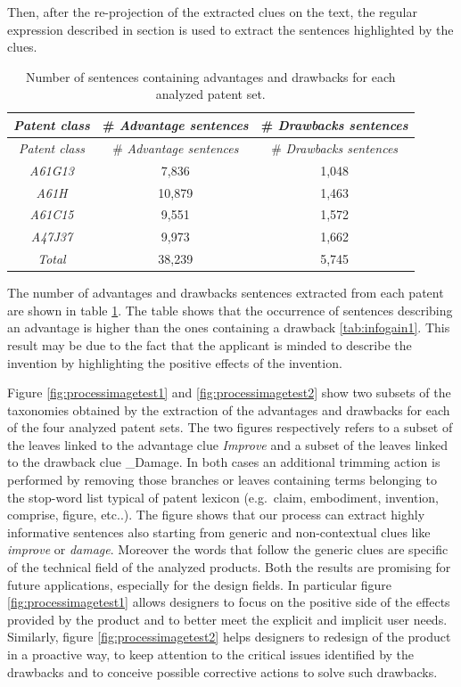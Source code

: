 \documentclass[]{book}
\theoremstyle{definition}
\theoremstyle{definition}
\theoremstyle{definition}
\theoremstyle{remark}
\begin{document}
Then, after the re-projection of the extracted clues on the text, the
regular expression described in section is used to extract the sentences
highlighted by the clues.

\begin{longtable}[]{@{}ccc@{}}
\caption{\label{tab:advantagedrawbackssentences} Number of sentences
containing advantages and drawbacks for each analyzed patent
set.}\tabularnewline
\toprule
\emph{Patent class} & \# \emph{Advantage sentences} & \# \emph{Drawbacks
sentences}\tabularnewline
\midrule
\endfirsthead
\toprule
\emph{Patent class} & \# \emph{Advantage sentences} & \# \emph{Drawbacks
sentences}\tabularnewline
\midrule
\endhead
\emph{A61G13} & 7,836 & 1,048\tabularnewline
\emph{A61H} & 10,879 & 1,463\tabularnewline
\emph{A61C15} & 9,551 & 1,572\tabularnewline
\emph{A47J37} & 9,973 & 1,662\tabularnewline
\emph{Total} & 38,239 & 5,745\tabularnewline
\bottomrule
\end{longtable}

The number of advantages and drawbacks sentences extracted from each
patent are shown in table \ref{tab:advantagedrawbackssentences}. The
table shows that the occurrence of sentences describing an advantage is
higher than the ones containing a drawback \ref{tab:infogain1}. This
result may be due to the fact that the applicant is minded to describe
the invention by highlighting the positive effects of the invention.

Figure \ref{fig:processimagetest1} and \ref{fig:processimagetest2} show
two subsets of the taxonomies obtained by the extraction of the
advantages and drawbacks for each of the four analyzed patent sets. The
two figures respectively refers to a subset of the leaves linked to the
advantage clue \emph{Improve} and a subset of the leaves linked to the
drawback clue \_Damage. In both cases an additional trimming action is
performed by removing those branches or leaves containing terms
belonging to the stop-word list typical of patent lexicon (e.g.~claim,
embodiment, invention, comprise, figure, etc..). The figure shows that
our process can extract highly informative sentences also starting from
generic and non-contextual clues like \emph{improve} or \emph{damage}.
Moreover the words that follow the generic clues are specific of the
technical field of the analyzed products. Both the results are promising
for future applications, especially for the design fields. In particular
figure \ref{fig:processimagetest1} allows designers to focus on the
positive side of the effects provided by the product and to better meet
the explicit and implicit user needs. Similarly, figure
\ref{fig:processimagetest2} helps designers to redesign of the product
in a proactive way, to keep attention to the critical issues identified
by the drawbacks and to conceive possible corrective actions to solve
such drawbacks.
\end{document}
